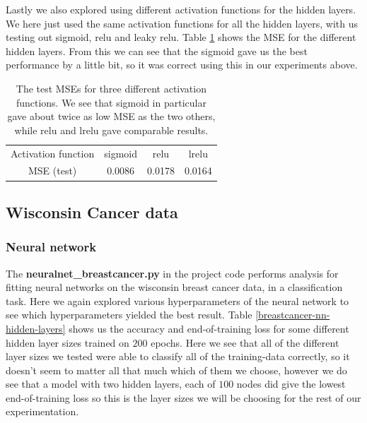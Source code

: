 \documentclass{article}
\begin{document}
Lastly we also explored using different activation functions for the hidden
layers. We here just used the same activation functions for all the hidden
layers, with us testing out sigmoid, relu and leaky relu. Table
\ref{franke-different-activ-funcs} shows the MSE for the different hidden
layers. From this we can see that the sigmoid gave us the best performance by a
little bit, so it was correct using this in our experiments above.

\begin{table}
      \centering
      \begin{tabular}{| c | c | c | c |}
            Activation function & sigmoid & relu   & lrelu  \\
            MSE (test)          & 0.0086  & 0.0178 & 0.0164
      \end{tabular}
      \caption{The test MSEs for three different activation functions. We see
            that sigmoid in particular gave about twice as low MSE as the two others,
            while relu and lrelu gave comparable results.}
      \label{franke-different-activ-funcs}
\end{table}


\subsection{Wisconsin Cancer data}
\subsubsection{Neural network}
The \textbf{neuralnet\_breastcancer.py} in the project code performs analysis for
fitting neural networks on the wisconsin breast cancer data, in a classification
task. Here we again explored various hyperparameters of the neural network to
see which hyperparameters yielded the best result. Table \ref{breastcancer-nn-hidden-layers}
shows us the accuracy and end-of-training loss for some different hidden layer sizes trained on $200$ epochs.
Here we see that all of the different layer sizes we tested were able to classify
all of the training-data correctly, so it doesn't seem to matter all that much
which of them we choose, however we do see that a model with two hidden layers,
each of $100$ nodes did give the lowest end-of-training loss so this is the
layer sizes we will be choosing for the rest of our experimentation.
\end{document}
